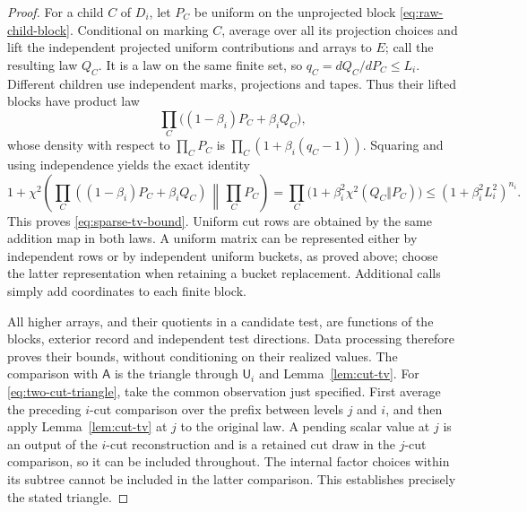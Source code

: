 \begin{proof}
For a child $C$ of $D_i$, let $P_C$ be uniform on the unprojected block
\eqref{eq:raw-child-block}.  Conditional on marking $C$, average over all its
projection choices and lift the independent projected uniform contributions
and arrays to $E$; call the resulting law $Q_C$.  It is a law on the same
finite set, so $q_C=dQ_C/dP_C\le L_i$.  Different children use independent
marks, projections and tapes.  Thus their lifted blocks have product law
\[
 \prod_C\bigl((1-\beta_i)P_C+\beta_iQ_C\bigr),
\]
whose density with respect to $\prod_CP_C$ is
$\prod_C(1+\beta_i(q_C-1))$.  Squaring and using independence yields the
exact identity
\[
 1+\chi^2\!\left(
   \prod_C((1-\beta_i)P_C+\beta_iQ_C)
      \,\middle\Vert\,\prod_CP_C\right)
  =\prod_C\bigl(1+\beta_i^2\chi^2(Q_C\Vert P_C)\bigr)
  \le(1+\beta_i^2L_i^2)^{n_i}.
\]
This proves \eqref{eq:sparse-tv-bound}.  Uniform cut rows are obtained by the
same addition map in both laws.  A uniform matrix can be represented either
by independent rows or by independent uniform buckets, as proved above;
choose the latter representation when retaining a bucket replacement.
Additional calls simply add coordinates to each finite block.

All higher arrays, and their quotients in a candidate test, are functions of
the blocks, exterior record and independent test directions.  Data processing
therefore proves their bounds, without conditioning on their realized values.
The comparison with $\mathsf A$ is the triangle through $\mathsf U_i$ and
Lemma~\ref{lem:cut-tv}.  For \eqref{eq:two-cut-triangle}, take the common
observation just specified.  First average the preceding
$i$-cut comparison over the prefix between levels $j$ and $i$, and then apply
Lemma~\ref{lem:cut-tv} at $j$ to the original law.  A pending scalar value at
$j$ is an output of the $i$-cut reconstruction and is a retained cut draw in
the $j$-cut comparison, so it can be included throughout.  The internal
factor choices within its subtree cannot be included in the latter
comparison.  This establishes precisely the stated triangle.
\end{proof}


